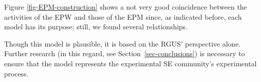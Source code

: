 Figure \ref{fig-EPM-construction} shows a not very good coincidence between the activities of the EPW and those of the EPM since, as indicated before, each model has its purpose; still, we found several relationships.

Though this model is plausible, it is based on the RGUS' perspective alone. Further research (in this regard, see Section~\ref{sec-conclusions}) is necessary to ensure that the model represents the experimental SE community's experimental process. 
